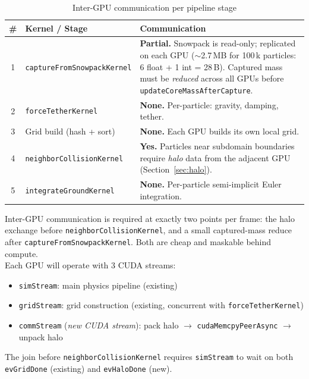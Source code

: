 \documentclass[conference]{IEEEtran}
\begin{document}
\begin{table}[t]
  \caption{Inter-GPU communication per pipeline stage}
  \label{tab:comm}
  \centering
  \begin{tabular}{clp{10cm}}
    \toprule
    \# & Kernel / Stage & Communication \\
    \midrule
    1 & \texttt{captureFromSnowpackKernel}
      & \textbf{Partial.} Snowpack is read-only; replicated on each GPU
        ($\sim$2.7\,MB for 100\,k particles: 6 float + 1 int = 28\,B).
        Captured mass must be \emph{reduced} across all GPUs before
        \texttt{updateCoreMassAfterCapture}. \\[2pt]
    2 & \texttt{forceTetherKernel}
      & \textbf{None.} Per-particle: gravity, damping, tether. \\[2pt]
    3 & Grid build (hash + sort)
      & \textbf{None.} Each GPU builds its own local grid. \\[2pt]
    4 & \texttt{neighborCollisionKernel}
      & \textbf{Yes.} Particles near subdomain boundaries require
        \emph{halo} data from the adjacent GPU
        (Section~\ref{sec:halo}). \\[2pt]
    5 & \texttt{integrateGroundKernel}
      & \textbf{None.} Per-particle semi-implicit Euler integration. \\
    \bottomrule
  \end{tabular}
\end{table}

Inter-GPU communication is required at exactly two points per frame: the
halo exchange before \texttt{neighborCollisionKernel}, and a small
captured-mass reduce after \texttt{captureFromSnowpackKernel}. Both are
cheap and maskable behind compute. \\
Each GPU will operate with 3 CUDA streams:

\begin{itemize}
  \item \texttt{simStream}: main physics pipeline (existing)
  \item \texttt{gridStream}: grid construction (existing, concurrent with
        \texttt{forceTetherKernel})
  \item \texttt{commStream} (\emph{new CUDA stream}): pack halo $\to$
        \texttt{cudaMemcpyPeerAsync} $\to$ unpack halo
\end{itemize}

The join before \texttt{neighborCollisionKernel} requires \texttt{simStream}
to wait on both \texttt{evGridDone} (existing) and \texttt{evHaloDone} (new).
\end{document}
